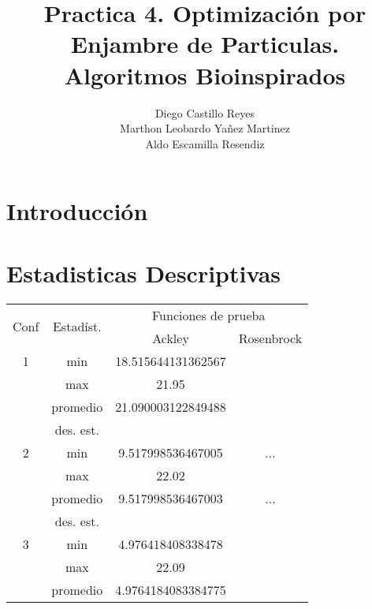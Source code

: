 \documentclass{report}
\title{\Huge{\textbf{Practica 4. Optimización por Enjambre de Particulas.}}\\
\Large{\textbf{Algoritmos Bioinspirados}}}
\author{Diego Castillo Reyes\\Marthon Leobardo Yañez Martinez\\Aldo Escamilla Resendiz}
\begin{document}
    \maketitle
    \tableofcontents
    \newpage
    \section{Introducción}


    \section{Estadisticas Descriptivas}
    \begin{table}[ht]
        \centering
        \begin{tabular}{|c|c|c|c|}
        \hline
        \multirow{2}{*}{Conf} & \multirow{2}{*}{Estadíst.} & \multicolumn{2}{c|}{Funciones de prueba} \\ \cline{3-4} 
                              &                             & Ackley & Rosenbrock \\ \hline
        1                     & min                         & 18.515644131362567 & \\ \cline{2-4} 
                              & max                         &     21.95       &        \\ \cline{2-4} 
                              & promedio                    &      21.090003122849488      &        \\ \cline{2-4} 
                              & des. est.                   &            &        \\ \hline
        2                     & min                         &     9.517998536467005   & ...    \\ \cline{2-4}
                              & max                         &  22.02   &        \\ \cline{2-4}
                              & promedio                    &    9.517998536467003    & ...    \\ \cline{2-4}
                              & des. est.                   &            &        \\ \hline
        3                     & min                         &      4.976418408338478      &        \\ \cline{2-4} 
                              & max                         &     22.09       &        \\ \cline{2-4} 
                              & promedio                    &      4.9764184083384775      &        \\ \cline{2-4} 

\end{tabular}
\end{table}
\end{document}
